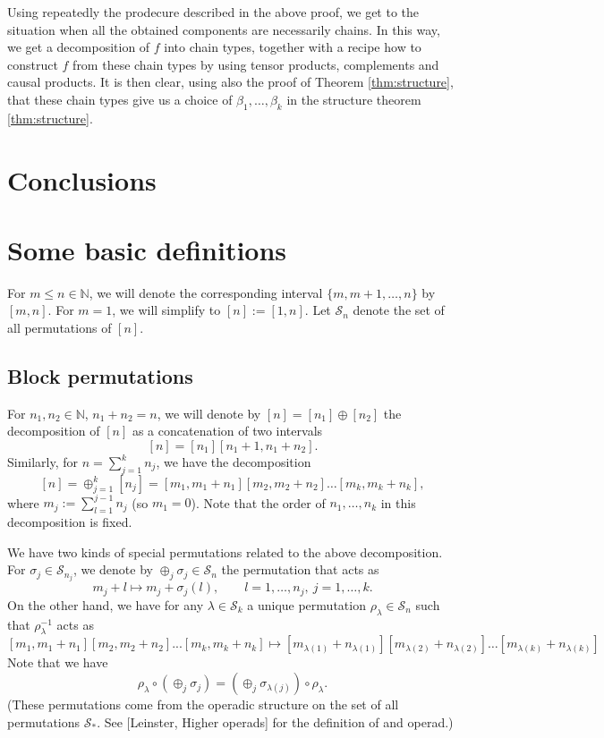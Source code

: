\documentclass[12pt]{article}
\theoremstyle{definition}
\theoremstyle{remark}
\def\permut{\mathscr{S}}
\begin{document}
Using repeatedly the prodecure described in the above proof, we get to the situation when
all the obtained components are necessarily chains. In this way, we get a decomposition of $f$ into
chain types, together with a recipe how to construct $f$ from these chain types by using
tensor products, complements  and causal products. It is then clear, using also the proof
of Theorem \ref{thm:structure}, that these chain types give us a choice of
$\beta_1,\dots,\beta_k$ in the structure theorem \ref{thm:structure}.




\section{Conclusions}





\appendix


\section{Some basic definitions}


For $m\le n\in \mathbb N$, we will denote the corresponding interval $\{m,m+1,\dots,n\}$ by
$[m,n]$. For $m=1$, we will simplify to  $[n]:=[1,n]$. Let $\permut_n$ denote the set of all permutations of $[n]$.


\subsection{Block permutations}
\label{sec:permut}


 For $n_1,n_2\in \mathbb N$, $n_1+n_2=n$, 
we will denote by $[n]=[n_1]\oplus [n_2]$ the decomposition of $[n]$ as a concatenation of two 
intervals
\[
[n]=[n_1][n_1+1,n_1+n_2].
\]
Similarly, for $n=\sum_{j=1}^kn_j$, we have the decomposition
\[
[n]=\oplus_{j=1}^k[n_j]=[m_1,m_1+n_1][m_2,m_2+n_2]\dots[m_k,m_k+n_k],
\]
where $m_j:=\sum_{l=1}^{j-1} n_j$ (so $m_1=0$). Note that the order of $n_1,\dots, n_k$ in
this decomposition is
fixed. 

We have two kinds of special permutations related to the above decomposition. For
$\sigma_j\in \permut_{n_j}$, we denote by $\oplus_j \sigma_j\in \permut_n$ the permutation that acts as
\[
m_j+l\mapsto m_j+\sigma_j(l),\qquad l=1,\dots,n_j,\ j=1,\dots, k. 
\]
On the other hand, we have for any $\lambda\in \permut_k$ a unique permutation
$\rho_\lambda\in\permut_n$  such that $\rho_\lambda^{-1}$ acts as
\[
[m_1,m_1+n_1][m_2,m_2+n_2]...[m_k,m_k+n_k]\mapsto
[m_{\lambda(1)}+n_{\lambda(1)}][m_{\lambda(2)}+n_{\lambda(2)}]\dots[m_{\lambda(k)}+n_{\lambda(k)}]
\]
Note that we have
\[
\rho_\lambda\circ(\oplus_j\sigma_j)=(\oplus_j \sigma_{\lambda(j)})\circ\rho_\lambda.
\]
(These permutations  come from the operadic structure on the set of
all permutations $\permut_*$. See [Leinster, Higher operads] for the definition of and operad.)
\end{document}
